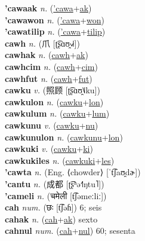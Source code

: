 \textbf{'cawaak} \textit{n.} (\hyperref['cawa]{'cawa}+\hyperref[ak]{ak})
 \label{'cawaak} \\
\textbf{'cawawon} \textit{n.} (\hyperref['cawa]{'cawa}+\hyperref[won]{won})
 \label{'cawawon} \\
\textbf{'cawatilip} \textit{n.} (\hyperref['cawa]{'cawa}+\hyperref[tilip]{tilip})
 \label{'cawatilip} \\
\textbf{cawh} \textit{n.} ({\chinese{}爪} [ʈ͡ʂɑʊ̯˧˩˧])
 \label{cawh} \\
\textbf{cawhak} \textit{n.} (\hyperref[cawh]{cawh}+\hyperref[ak]{ak})
 \label{cawhak} \\
\textbf{cawhcim} \textit{n.} (\hyperref[cawh]{cawh}+\hyperref[cim]{cim})
 \label{cawhcim} \\
\textbf{cawhfut} \textit{n.} (\hyperref[cawh]{cawh}+\hyperref[fut]{fut})
 \label{cawhfut} \\
\textbf{cawku} \textit{v.} ({\chinese{}照顾} [ʈ͡ʂɑʊ̯˥˩ku])
 \label{cawku} \\
\textbf{cawkulon} \textit{n.} (\hyperref[cawku]{cawku}+\hyperref[lon]{lon})
 \label{cawkulon} \\
\textbf{cawkulum} \textit{n.} (\hyperref[cawku]{cawku}+\hyperref[lum]{lum})
 \label{cawkulum} \\
\textbf{cawkunu} \textit{v.} (\hyperref[cawku]{cawku}+\hyperref[nu]{nu})
 \label{cawkunu} \\
\textbf{cawkunulon} \textit{n.} (\hyperref[cawkunu]{cawkunu}+\hyperref[lon]{lon})
 \label{cawkunulon} \\
\textbf{cawkuki} \textit{v.} (\hyperref[cawku]{cawku}+\hyperref[ki]{ki})
 \label{cawkuki} \\
\textbf{cawkukiles} \textit{n.} (\hyperref[cawkuki]{cawkuki}+\hyperref[les]{les})
 \label{cawkukiles} \\
\textbf{'cawta} \textit{n.} (Eng. ⟨chowder⟩ [ˈt͡ʃaʊ̯dɚ])
 \label{'cawta} \\
\textbf{'cantu} \textit{n.} ({\chinese{}成都} [ʈ͡ʂʰə˧˥ŋtu˥])
 \label{'cantu} \\
\textbf{'cameli} \textit{n.} ({\devanagari{}चमेली} [t͡ʃəmeːliː])
 \label{'cameli} \\
\textbf{cah} \textit{num.} ({\devanagari{}छः} [t͡ʃəɦ])
6; seis \label{cah} \\
\textbf{cahak} \textit{n.} (\hyperref[cah]{cah}+\hyperref[ak]{ak})
sexto \label{cahak} \\
\textbf{cahnul} \textit{num.} (\hyperref[cah]{cah}+\hyperref[nul]{nul})
60; sesenta \label{cahnul} \\
